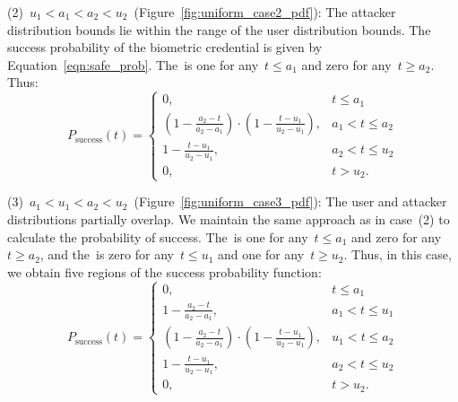 \documentclass[conference,compsoc]{IEEEtran}
\begin{document}
(2)~$u_1 < a_1 < a_2 < u_2$~(Figure~\ref{fig:uniform_case2_pdf}): The attacker distribution bounds lie within the range of the user distribution bounds.
The success probability of the biometric credential is given by Equation~\ref{eqn:safe_prob}.
The~\FAR is one for any~$t \le a_1$ and zero for any~$t \ge a_2$.
Thus:
\begin{equation*}
P_{\text{success}}(t) = 
\begin{cases}
    0, & t \le a_1 \\
    (1 - \frac{a_2-t}{a_2-a_1})\cdot(1-\frac{t-u_1}{u_2-u_1}), & a_1 < t \le a_2\\
    1 - \frac{t-u_1}{u_2-u_1}, & a_2 < t \le u_2 \\
    0, & t > u_2.
\end{cases}
\end{equation*}

(3)~$a_1 < u_1 < a_2 < u_2$~(Figure~\ref{fig:uniform_case3_pdf}): The user and attacker distributions partially overlap.
We maintain the same approach as in case~(2) to calculate the probability of success. The~\FAR is one for any~$t \le a_1$ and zero for any~$t \ge a_2$, and the~\FRR is zero for any~$t \le u_1$ and one for any~$t \ge u_2$. Thus, in this case, we obtain five regions of the success probability function:
\begin{equation*}
P_{\text{success}}(t) = 
\begin{cases}
    0, & t \le a_1 \\
    1 - \frac{a_2-t}{a_2-a_1}, & a_1 < t \le u_1 \\
    (1 - \frac{a_2-t}{a_2-a_1})\cdot(1-\frac{t-u_1}{u_2-u_1}), & u_1 < t \le a_2\\
    1 - \frac{t-u_1}{u_2-u_1}, & a_2 < t \le u_2 \\
    0, & t > u_2.
\end{cases}
\end{equation*}
\end{document}
